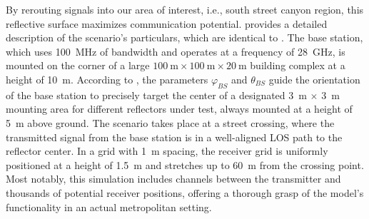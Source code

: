 By rerouting signals into our area of interest, i.e., south street canyon region, this reflective surface maximizes communication potential.  provides a detailed description of the scenario's particulars, which are identical to \cite{Helios}. The base station, which uses \SI{100}{\mega\hertz} of bandwidth and operates at a frequency of \SI{28}{\giga\hertz}, is mounted on the corner of a large $ \SI{100}{\meter} \times  \SI{100}{\meter} \times \SI{20}{\meter}$ building complex at a height of \SI{10}{\meter}. According to , the parameters $\varphi_{BS}$ and $\theta_{BS}$ guide the orientation of the base station to precisely target the center of a designated \SI{3}{\meter} $\times$ \SI{3}{\meter}  mounting area for different reflectors under test, always mounted at a height of \SI{5}{\meter} above ground. The scenario takes place at a street crossing, where the transmitted signal from the base station is in a well-aligned LOS path to the reflector center. In a grid with \SI{1}{\meter} spacing, the receiver grid is uniformly positioned at a height of \SI{1.5}{\meter} and stretches up to \SI{60}{\meter} from the crossing point. Most notably, this simulation includes channels between the transmitter and thousands of potential receiver positions, offering a thorough grasp of the model's functionality in an actual metropolitan setting.

